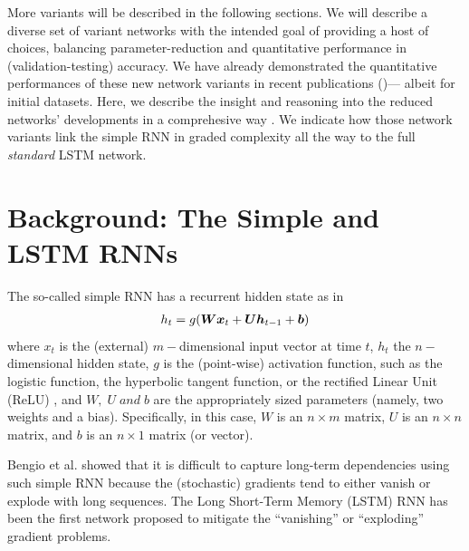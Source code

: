 \documentclass{article}
\begin{document}
More variants will be described in the following sections.  We will describe a diverse set of variant networks with the intended goal of providing a host of choices, balancing parameter-reduction and quantitative performance in (validation-testing) accuracy. We have already demonstrated the quantitative performances of these new network variants in recent publications (\cite {LuSalem2017, HeckSalem2017, DeySalem2017, AkandehSalem2017I, AkandehSalem2017II,  AkandehSalem2017III})--- albeit for initial datasets. Here, we describe the insight and reasoning into the reduced networks' developments in a comprehesive way \cite{salem2016reduced}. We indicate how those network variants link the simple RNN in graded complexity all the way to the full \textit{standard} LSTM network.

\section{Background: The Simple and LSTM RNNs}
The so-called simple RNN has a recurrent hidden state as in
\begin{align} \label{eqn:1}	h_t = g({\bm{W}} {\bm{x}}_{t} + {\bm{U}} {\bm{h}}_{{t}-1} + {\bm{b}})
\end{align}
where $x_t$ is the (external)  $m-$dimensional input vector at time $t$, $h_t$ the $n-$dimensional hidden state, $g$ is the (point-wise) activation function, such as the logistic function,  the hyperbolic tangent function, or the rectified Linear Unit (ReLU) \cite{chung2014empirical, zaremba2015empirical}, and $W,\;U\; and\; b$ are the appropriately sized parameters (namely, two weights and a bias). Specifically, in this case,  $W$ is an $n \times m$ matrix,  $U$ is an $n \times n$ matrix, and $b$ is an $n \times 1$ matrix (or vector).

Bengio et al. \cite{bengio1994learning} showed that it is difficult to capture long-term dependencies using such simple RNN because the (stochastic) gradients tend to either vanish or explode with long sequences.  The Long Short-Term Memory (LSTM) RNN \cite{hochreiter1997long, gers2002learning} has been the first network proposed to mitigate the “vanishing” or “exploding” gradient problems.
\end{document}
